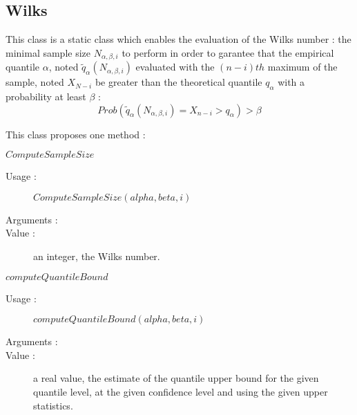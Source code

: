 
\newpage \subsection{Wilks}

This class is a static class which enables the evaluation of the Wilks number : the minimal sample size $N_{\alpha, \beta, i}$ to perform in order to garantee that the empirical quantile $\alpha$, noted $\tilde{q}_{\alpha}(N_{\alpha, \beta, i})$ evaluated with the $(n-i)th$ maximum of the sample, noted $X_{N-i}$ be greater than the theoretical quantile $q_{\alpha}$ with a probability at least $\beta$ :
$$
Prob(\tilde{q}_{\alpha}(N_{\alpha, \beta, i}) = X_{n-i} > q_{\alpha}) > \beta
$$

This class proposes one method :

\begin{description}

\item $ComputeSampleSize$
  \begin{description}
  \item[Usage :] $ComputeSampleSize(alpha, beta, i)$
  \item[Arguments :] \rule{0pt}{1em}
  \item[Value :] an integer, the Wilks number.
  \end{description}
\item $computeQuantileBound$
  \begin{description}
  \item[Usage :] $computeQuantileBound(alpha, beta, i)$
  \item[Arguments :] \rule{0pt}{1em}
  \item[Value :] a real value, the estimate of the quantile upper bound for the given quantile level, at the given confidence level and using the given upper statistics.
  \end{description}
\end{description}




